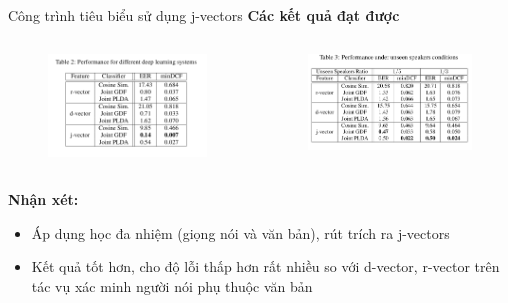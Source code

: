 \documentclass[notheorems, aspectratio=54]{beamer}
\begin{document}
\begin{frame}{Công trình tiêu biểu sử dụng j-vectors}
	\textbf{Các kết quả đạt được}
	\begin{columns}
		\begin{column}{0.5\textwidth}
			\begin{figure}[H]
				\includegraphics[width=1\linewidth]{images/j-vectors-result-table-02.png}
			\end{figure}
		\end{column}
		\begin{column}{0.5\textwidth}
			\begin{figure}[H]
				\includegraphics[width=1\linewidth]{images/j-vectors-result-table-03.png}
		\end{figure}
		\end{column}
	\end{columns}
	\textbf{Nhận xét:}
	\begin{itemize}
		\item Áp dụng học đa nhiệm (giọng nói và văn bản), rút trích ra j-vectors
		\item Kết quả tốt hơn, cho độ lỗi thấp hơn rất nhiều so với d-vector, r-vector trên tác vụ xác minh người nói phụ thuộc văn bản
	\end{itemize}
\end{frame}
\end{document}
